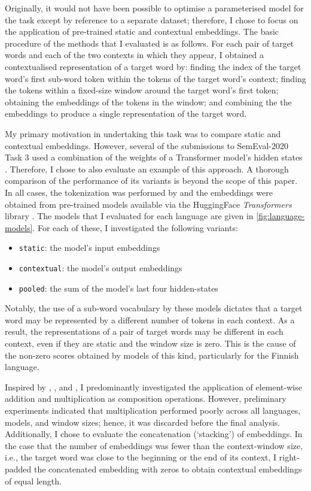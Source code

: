 Originally, it would not have been possible to optimise a parameterised model for the
task except by reference to a separate dataset; therefore, I chose to focus on the
application of pre-trained static and contextual embeddings.
The basic procedure of the methods that I evaluated is as follows.
For each pair of target words and each of the two contexts in which they appear, I
obtained a contextualised representation of a target word by:
finding the index of the target word's first sub-word token within the tokens of the target word's context;
finding the tokens within a fixed-size window around the target word's first token;
obtaining the embeddings of the tokens in the window; and
combining the the embeddings to produce a single representation of the target word.

My primary motivation in undertaking this task was to compare static and contextual
embeddings.
However, several of the submissions to SemEval-2020 Task 3 used a combination of the
weights of a Transformer model's hidden states
\parencites[e.g.,][276]{Gamallo2020}[3]{Pessutto2020}[4]{Hettiarachchi2021}.
Therefore, I chose to also evaluate an example of this approach.
A thorough comparison of the performance of its variants is beyond the
scope of this paper.
In all cases, the tokenization was performed by and the embeddings were obtained from
pre-trained models available via the HuggingFace \emph{Transformers} library
\parencite{Wolf2020}.
The models that I evaluated for each language are given in \cref{fig:language-models}.
For each of these, I investigated the following variants:
\begin{itemize}
  \item \texttt{static}: the model's input embeddings
  \item \texttt{contextual}: the model's output embeddings
  \item \texttt{pooled}: the sum of the model's last four hidden-states
\end{itemize}

Notably, the use of a sub-word vocabulary by these models
\parencite[e.g.,][4174]{Devlin2019} dictates that a target word may be represented by a
different number of tokens in each context.
As a result, the representations of a pair of target words may be different in each
context, even if they are static and the window size is zero.
This is the cause of the non-zero scores obtained by models of this kind, particularly
for the Finnish language.

Inspired by \textcite{Landauer1997}, \textcite{Kintsch2001}, and
\textcite{Mitchell2008}, I predominantly investigated the application of element-wise
addition and multiplication as composition operations.
However, preliminary experiments indicated that multiplication performed poorly across
all languages, models, and window sizes; hence, it was discarded before the final
analysis.
Additionally, I chose to evaluate the concatenation (`stacking') of embeddings.
In the case that the number of embeddings was fewer than the context-window size, i.e.,
the target word was close to the beginning or the end of its context, I right-padded the
concatenated embedding with zeros to obtain contextual embeddings of equal length.

